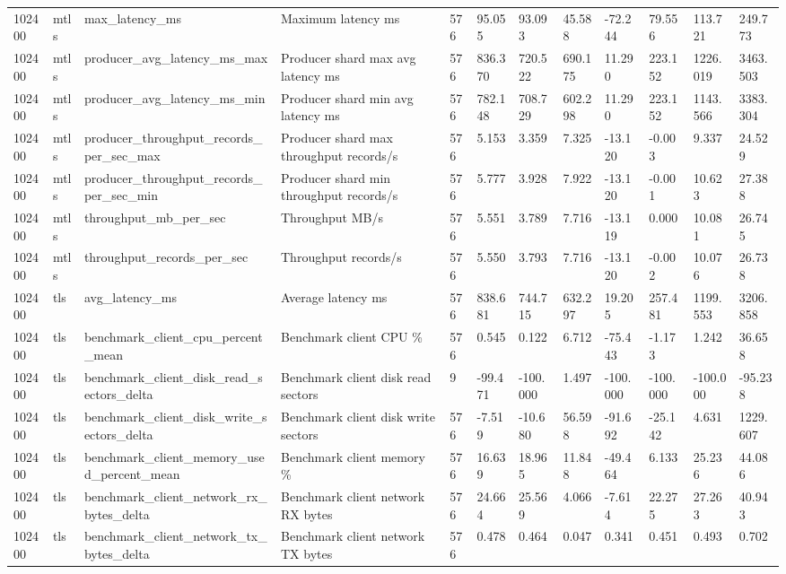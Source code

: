 \begin{longtable}{llllllllllll}
102400 & mtls & max\_latency\_ms & Maximum latency ms & 576 & 95.055 & 93.093 & 45.588 & -72.244 & 79.556 & 113.721 & 249.773 \\
102400 & mtls & producer\_avg\_latency\_ms\_max & Producer shard max avg latency ms & 576 & 836.370 & 720.522 & 690.175 & 11.290 & 223.152 & 1226.019 & 3463.503 \\
102400 & mtls & producer\_avg\_latency\_ms\_min & Producer shard min avg latency ms & 576 & 782.148 & 708.729 & 602.298 & 11.290 & 223.152 & 1143.566 & 3383.304 \\
102400 & mtls & producer\_throughput\_records\_per\_sec\_max & Producer shard max throughput records/s & 576 & 5.153 & 3.359 & 7.325 & -13.120 & -0.003 & 9.337 & 24.529 \\
102400 & mtls & producer\_throughput\_records\_per\_sec\_min & Producer shard min throughput records/s & 576 & 5.777 & 3.928 & 7.922 & -13.120 & -0.001 & 10.623 & 27.388 \\
102400 & mtls & throughput\_mb\_per\_sec & Throughput MB/s & 576 & 5.551 & 3.789 & 7.716 & -13.119 & 0.000 & 10.081 & 26.745 \\
102400 & mtls & throughput\_records\_per\_sec & Throughput records/s & 576 & 5.550 & 3.793 & 7.716 & -13.120 & -0.002 & 10.076 & 26.738 \\
102400 & tls & avg\_latency\_ms & Average latency ms & 576 & 838.681 & 744.715 & 632.297 & 19.205 & 257.481 & 1199.553 & 3206.858 \\
102400 & tls & benchmark\_client\_cpu\_percent\_mean & Benchmark client CPU \% & 576 & 0.545 & 0.122 & 6.712 & -75.443 & -1.173 & 1.242 & 36.658 \\
102400 & tls & benchmark\_client\_disk\_read\_sectors\_delta & Benchmark client disk read sectors & 9 & -99.471 & -100.000 & 1.497 & -100.000 & -100.000 & -100.000 & -95.238 \\
102400 & tls & benchmark\_client\_disk\_write\_sectors\_delta & Benchmark client disk write sectors & 576 & -7.519 & -10.680 & 56.598 & -91.692 & -25.142 & 4.631 & 1229.607 \\
102400 & tls & benchmark\_client\_memory\_used\_percent\_mean & Benchmark client memory \% & 576 & 16.639 & 18.965 & 11.848 & -49.464 & 6.133 & 25.236 & 44.086 \\
102400 & tls & benchmark\_client\_network\_rx\_bytes\_delta & Benchmark client network RX bytes & 576 & 24.664 & 25.569 & 4.066 & -7.614 & 22.275 & 27.263 & 40.943 \\
102400 & tls & benchmark\_client\_network\_tx\_bytes\_delta & Benchmark client network TX bytes & 576 & 0.478 & 0.464 & 0.047 & 0.341 & 0.451 & 0.493 & 0.702 \\

\end{longtable}
